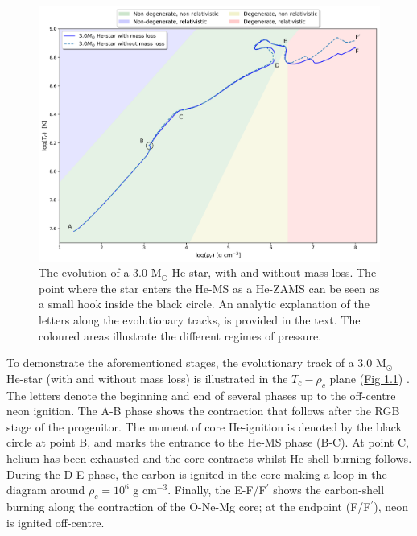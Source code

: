 \documentclass[../../main/thesis_msc.tex]{subfiles}
\begin{document}
				\begin{figure}[t]
					\centering
					\includegraphics[scale=0.5]{../figures/chapter1/T_rho_plane_ch1_shaded.png}
					\caption{The evolution of a $3.0$ M$_{\odot}$ He-star, with and without mass loss. The point where the star enters the He-MS as a He-ZAMS can be seen as a small hook inside the black circle. An analytic explanation of the letters along the evolutionary tracks, is provided in the text. The coloured areas illustrate the different regimes of pressure.}
					\label{fig:T_rho_plane_ch1}
				\end{figure}
				
				To demonstrate the aforementioned stages, the evolutionary track of a $3.0$ M$_{\odot}$ He-star (with and without mass loss) is illustrated in the $T_c - \rho_c$ plane (\hyperref[fig:T_rho_plane_ch1]{Fig 1.1}) \citep[see also][]{Habets_a, Habets_b, Nomoto1987}. The letters denote the beginning and end of several phases up to the off-centre neon ignition. The A-B phase shows the contraction that follows after the RGB stage of the progenitor. The moment of core He-ignition is denoted by the black circle at point B, and marks the entrance to the He-MS phase (B-C). At point C, helium has been exhausted and the core contracts whilst He-shell burning follows. During the D-E phase, the carbon is ignited in the core making a loop in the diagram around $\rho_c = 10^6$ g cm$^{-3}$. Finally, the E-F/F$^\prime$ shows the carbon-shell burning along the contraction of the O-Ne-Mg core; at the endpoint (F/F$^\prime$), neon is ignited off-centre.
				
\end{document}
